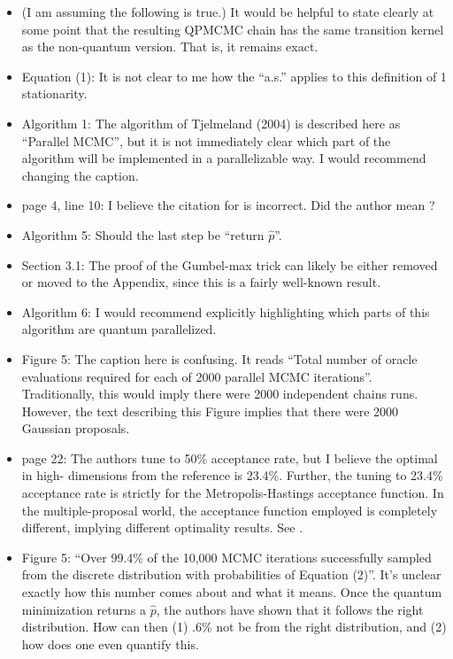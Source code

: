 \documentclass[12pt]{article}
\begin{document}
\begin{itemize}
	\item (I am assuming the following is true.) It would be helpful to state clearly at some point that the resulting QPMCMC chain has the same transition kernel as the non-quantum version. That is, it remains exact.
	
	\item Equation (1): It is not clear to me how the ``a.s.'' applies to this definition of 1
	stationarity.
	
	\item Algorithm 1: The algorithm of Tjelmeland (2004) is described here as ``Parallel MCMC'', but it is not immediately clear which part of the algorithm will be implemented in a parallelizable way. I would recommend changing the caption.
	
	\item page 4, line 10: I believe the citation for \citet{gelman1992inference} is incorrect. Did the author mean \citet{gelman1992inference}?
	
	\item Algorithm 5: Should the last step be ``return $\hat{p}$''.
	
	\item Section 3.1: The proof of the Gumbel-max trick can likely be either removed or
	moved to the Appendix, since this is a fairly well-known result.
	
	\item Algorithm 6: I would recommend explicitly highlighting which parts of this algorithm are quantum parallelized.
	
	\item Figure 5: The caption here is confusing. It reads ``Total number of oracle evaluations required for each of 2000 parallel MCMC iterations''. Traditionally, this would imply there were 2000 independent chains runs. However, the text describing this Figure implies that there were 2000 Gaussian proposals.
	
	\item page 22: The authors tune to 50\% acceptance rate, but I believe the optimal in high- dimensions from the reference \citet{rosenthal2011optimal} is 23.4\%. Further, the tuning to 23.4\% acceptance rate is strictly for the Metropolis-Hastings acceptance function. In the multiple-proposal world, the acceptance function employed is completely different, implying different optimality results. See \citet{agrawal2021optimal}.
	
	
	\item Figure 5: ``Over 99.4\% of the 10,000 MCMC iterations successfully sampled from the discrete distribution with probabilities of Equation (2)''. It’s unclear exactly how this number comes about and what it means. Once the quantum minimization returns a $\hat{p}$, the authors have shown that it follows the right distribution. How can then (1) .6\% not be from the right distribution, and (2) how does one even quantify this.
	

\end{itemize}
\end{document}
